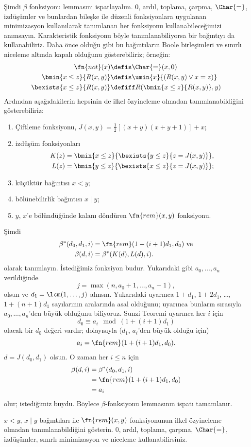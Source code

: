 \documentclass[../../../include/open-logic-section]{subfiles}
\begin{document}
Şimdi $\beta$ fonksiyonu lemmasını ispatlayalım. $0$, ardıl, toplama,
çarpma, $\Char{=}$, izdüşümler ve bunlardan bileşke ile düzenli fonksiyonlara
uygulanan minimizasyon kullanılarak tanımlanan her fonksiyonu
kullanabileceğimizi anımsayın. Karakteristik fonksiyonu böyle
tanımlanabiliyorsa bir bağıntıyı da kullanabiliriz. Daha önce olduğu gibi bu
bağıntıların Boole birleşimleri ve sınırlı niceleme altında kapalı olduğunu
gösterebiliriz; örneğin:
\begin{align*}
\fn{not}(x) & \defis \Char{=}(x,0)\\
\bmin{x \leq z}{R(x,y)} & \defis \umin{x}{(R(x,y) \lor x = z)}\\
\bexists{x \leq z}{R(x,y)} & \defiff R(\bmin{x \leq z}{R(x,y)}, y)
\end{align*}
Ardından aşağıdakilerin hepsinin de ilkel özyineleme olmadan
tanımlanabildiğini gösterebiliriz:
\begin{enumerate}
\item Çiftleme fonksiyonu, $J(x,y) = \frac{1}{2}[(x+y)(x+y+1)] + x$;
\item izdüşüm fonksiyonları
\begin{align*}
K(z) & = \bmin{x \leq z}{\bexists{y \leq z}{z = J(x,y)}},\\
L(z) & = \bmin{y \leq z}{\bexists{x \leq z}{z = J(x,y)}};
\end{align*}
\item küçüktür bağıntısı $x<y$;
\item bölünebilirlik bağıntısı $x\mid y$;
\item $y$, $x$'e bölündüğünde kalanı döndüren $\fn{rem}(x,y)$ fonksiyonu.
\end{enumerate}
Şimdi
\begin{align*}
\beta^*(d_0,d_1,i) & = \fn{rem}(1+(i+1) d_1,d_0) \text{ ve}\\
\beta(d,i) & = \beta^*(K(d),L(d),i).
\end{align*}
olarak tanımlayın. İstediğimiz fonksiyon budur. Yukarıdaki gibi
$a_0,\dots,a_n$ verildiğinde
\[
j = \max(n,a_0+1,\dots,a_n+1),
\]
olsun ve $d_1=\lcm(1,\dots,j)$ alınsın. Yukarıdaki 
uyarınca $1+d_1$, $1+2d_1$, \dots, $1+(n+1)d_1$ sayılarının aralarında asal
olduğunu;  uyarınca bunların sırasıyla $a_0,\dots,a_n$'den
büyük olduğunu biliyoruz. Sunzi Teoremi uyarınca her $i$ için
\[
d_0 \equiv a_i \mod (1+(i+1)d_1)
\]
olacak bir $d_0$ değeri vardır; dolayısıyla ($d_1$, $a_i$'den büyük olduğu
için)
\[
a_i = \fn{rem}(1+(i+1)d_1,d_0).
\]
$d=J(d_0,d_1)$ olsun. O zaman her $i\le n$ için
\begin{align*}
\beta(d,i) & =  \beta^*(d_0,d_1,i) \\
& =  \fn{rem}(1+(i+1) d_1,d_0) \\
& =  a_i
\end{align*}
olur; istediğimiz buydu. Böylece $\beta$-fonksiyonu lemmasının ispatı
tamamlanır.

\begin{prob}
  $x<y$, $x\mid y$ bağıntıları ile $\fn{rem}(x,y)$ fonksiyonunun ilkel
  özyineleme olmadan tanımlanabildiğini gösterin. $0$, ardıl, toplama,
  çarpma, $\Char{=}$, izdüşümler, sınırlı minimizasyon ve niceleme
  kullanabilirsiniz.
\end{prob}
\end{document}

